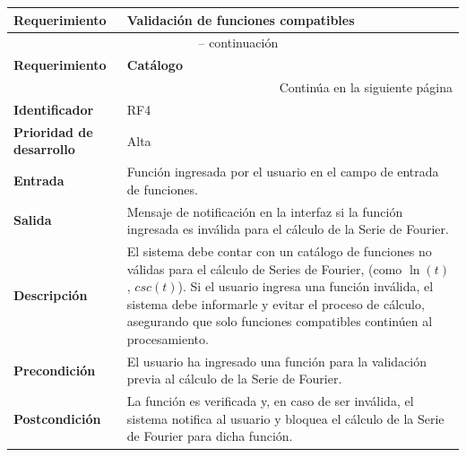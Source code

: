\begin{longtable}{|m{3.5cm}|m{9.5cm}|}
	\hline
	\rowcolor{black!75} \color{white}\textbf{Requerimiento} & \color{white}\textbf{Validación de funciones compatibles} \\
	\hline
	\endfirsthead
	\multicolumn{2}{c}{{\tablename\ \thetable{} -- continuación}} \\
	\hline
	\rowcolor{black!75} \color{white}\textbf{Requerimiento} & \color{white}\textbf{Catálogo} \\
	\hline
	\endhead
	\hline \multicolumn{2}{r}{{Continúa en la siguiente página}} \\
	\endfoot
	\hline
	\endlastfoot
	
	\textbf{Identificador} & RF4 \\
	\hline
	\textbf{Prioridad de desarrollo} & Alta \\
	\hline
	\textbf{Entrada} & Función ingresada por el usuario en el campo de entrada de funciones. \\
	\hline
	\textbf{Salida} & Mensaje de notificación en la interfaz si la función ingresada es inválida para el cálculo de la Serie de Fourier. \\
	\hline
	\textbf{Descripción} & El sistema debe contar con un catálogo de funciones no válidas para el cálculo de Series de Fourier, (como \( \ln(t) \), $csc(t)$). Si el usuario ingresa una función inválida, el sistema debe informarle y evitar el proceso de cálculo, asegurando que solo funciones compatibles continúen al procesamiento. \\
	\hline
	\textbf{Precondición} & El usuario ha ingresado una función para la validación previa al cálculo de la Serie de Fourier. \\
	\hline
	\textbf{Postcondición} & La función es verificada y, en caso de ser inválida, el sistema notifica al usuario y bloquea el cálculo de la Serie de Fourier para dicha función. \\
	\hline
\end{longtable}
\caption{Requerimiento funcional No. 4} \label{tabla:RF4}
\vspace{0.5cm}


